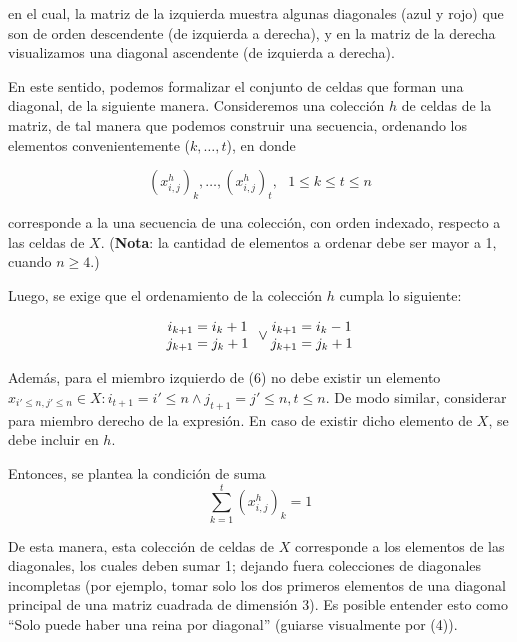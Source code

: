 \documentclass[letterpaper,11pt,spanish]{article}
\begin{document}
en el cual, la matriz de la izquierda muestra algunas diagonales (azul y rojo) que son de orden descendente (de izquierda a derecha), y en la matriz de la derecha visualizamos una diagonal ascendente (de izquierda a derecha).

En este sentido, podemos formalizar el conjunto de celdas que forman una diagonal, de la siguiente manera. Consideremos una colección $h$ de celdas de la matriz, de tal manera que podemos construir una secuencia, ordenando los elementos convenientemente ($k,\ldots,t$), en donde

\begin{equation}
(x^h_{i,j})_k,\ldots,(x^h_{i,j})_t,\text{ } 1\leq k \leq t\leq n
\end{equation}

corresponde a la una secuencia de una colección, con orden indexado, respecto a las celdas de $X$. (\textbf{Nota}: la cantidad de elementos a ordenar debe ser mayor a 1, cuando $n \geq 4$.)

Luego, se exige que el ordenamiento de la colección $h$ cumpla lo siguiente:

\begin{equation}
\begin{matrix}
i_{k+1} = i_k+1\\
j_{k+1} = j_k+1\\
\end{matrix}\\ \vee
\begin{matrix}
i_{k+1} = i_k-1\\
j_{k+1} = j_k+1\\
\end{matrix}
\end{equation}

Además, para el miembro izquierdo de (6) no debe existir un elemento $x_{i'\leq n,j'\leq n} \in X : i_{t+1} = i'\leq n \wedge j_{t+1} = j'\leq n, t\leq n$. De modo similar, considerar para miembro derecho de la expresión. En caso de existir dicho elemento de $X$, se debe incluir en $h$.

Entonces, se plantea la condición de suma
\begin{equation}
\sum_{k=1}^t(x^h_{i,j})_k = 1
\end{equation}

De esta manera, esta colección de celdas de $X$ corresponde a los elementos de las diagonales, los cuales deben sumar 1; dejando fuera colecciones de diagonales incompletas (por ejemplo, tomar solo los dos primeros elementos de una diagonal principal de una matriz cuadrada de dimensión 3). Es posible entender esto como ``Solo puede haber una reina por diagonal'' (guiarse visualmente por (4)).
\end{document}
